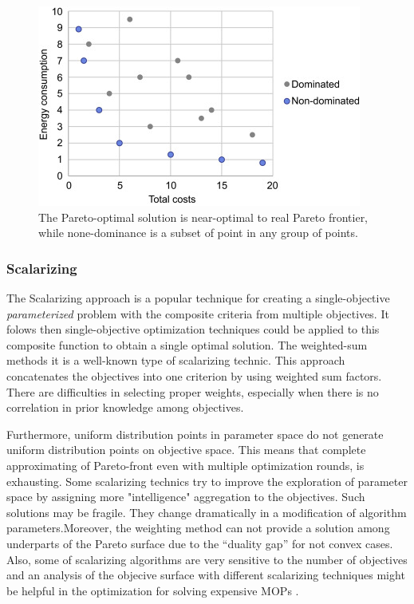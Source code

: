                 \begin{figure}
                    \centering
                    \includegraphics{content/images/dominated}
                    \caption[Pareto-optimal points vs. none dominated]{The Pareto-optimal solution is near-optimal to real Pareto frontier, while none-dominance is a subset of point in any group of points.}
                    \label{fig:dominated}
                \end{figure}
        
            \subsubsection{Scalarizing}
                The Scalarizing approach is a popular technique for creating a single-objective \textit{parameterized} problem with the composite criteria from multiple objectives. It folows then single-objective optimization techniques could be applied to this composite function to obtain a single optimal solution. The weighted-sum methods it is a well-known type of scalarizing technic. This approach concatenates the objectives into one criterion by using weighted sum factors. There are difficulties in selecting proper weights, especially when there is no correlation in prior knowledge among objectives.  

                Furthermore, uniform distribution points in parameter space do not generate uniform distribution points on objective space. This means that complete approximating of Pareto-front even with multiple optimization rounds, is exhausting.
                Some scalarizing technics try to improve the exploration of parameter space by assigning more "intelligence" aggregation to the objectives. Such solutions may be fragile. They change dramatically in a modification of algorithm parameters.Moreover, the weighting method can not provide a solution among underparts of the Pareto surface due to the “duality gap” for not convex cases.                 Also, some of scalarizing algorithms are very sensitive to the number of objectives and an analysis of the objecive surface with different scalarizing techniques might be helpful in the optimization for solving expensive MOPs \cite{ChughScal2019}.

